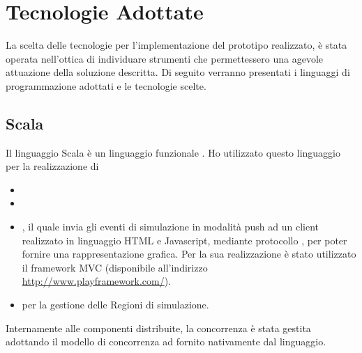 \chapter{Tecnologie Adottate}

La scelta delle tecnologie per l'implementazione del prototipo realizzato, è stata operata nell'ottica di individuare strumenti che permettessero una agevole attuazione della soluzione descritta. 
Di seguito verranno presentati i linguaggi di programmazione adottati e le tecnologie scelte.

	\section{Scala}
		Il linguaggio Scala è un linguaggio funzionale . Ho utilizzato questo linguaggio per la realizzazione di 
			\begin{itemize}
				\item {}
				\item {}
				\item {}, il quale invia gli eventi di simulazione in modalità push ad un client realizzato in linguaggio HTML e Javascript, mediante protocollo , per poter fornire una rappresentazione grafica. Per la sua realizzazione è stato utilizzato il framework MVC  (disponibile all'indirizzo \url{http://www.playframework.com/}).
				\item {} per la gestione delle Regioni di simulazione.
			\end{itemize}
		Internamente alle componenti distribuite, la concorrenza è stata gestita adottando il modello di concorrenza ad  fornito nativamente dal linguaggio. 
		
